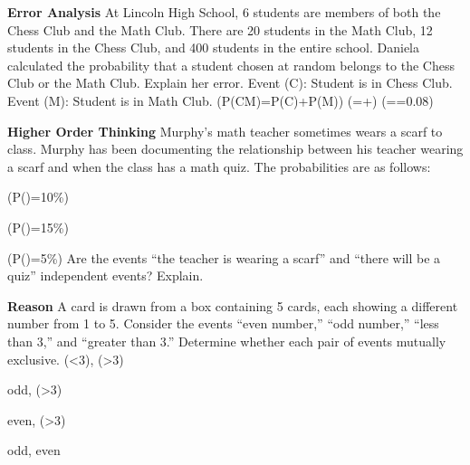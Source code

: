 \documentclass{article}
\newenvironment{practice}[2]{}{}        %
\newcommand{\answer}[1]{}               %
\newcommand{\te}[1]{}                   %
\begin{document}
\begin{practice}{10}{3}
\textbf{Error Analysis} At Lincoln High School, 6 students are members of both the Chess Club and the Math Club. There are 20 students in the Math Club, 12 students in the Chess Club, and 400 students in the entire school.
Daniela calculated the probability that a student chosen at random belongs to the Chess Club or the Math Club. Explain her error.
Event (C): Student is in Chess Club.
Event (M): Student is in Math Club.
(P(CM)=P(C)+P(M))
(=+)
(==0.08)
\te{Red X marks the student's work.}
\answer{The events (C) and (M) are not mutually exclusive, so it is not true that (P(C\text{ or }M)=P(C)+P(M)). So, subtract the probability that a student is in both clubs to find the probability that a random student is in the Chess Club or the Math Club. (P(C\text{ or }M)=P(C)+P(M)-P(C\text{ and }M)).}
\end{practice}
\begin{practice}{11}{2}
\textbf{Higher Order Thinking} Murphy's math teacher sometimes wears a scarf to class. Murphy has been documenting the relationship between his teacher wearing a scarf and when the class has a math quiz. The probabilities are as follows:
\item (P()=10\%)
\item (P()=15\%)
\item (P()=5\%)
Are the events “the teacher is wearing a scarf” and “there will be a quiz” independent events? Explain.
\answer{No; two events (A) and (B) are independent if and only if (P(A)\cdot P(B)=P(A\text{ and }B)) and ((0.10)(0.15)\neq0.05).}
\end{practice}
\begin{practice}{12}{1}
\textbf{Reason} A card is drawn from a box containing 5 cards, each showing a different number from 1 to 5. Consider the events “even number,” “odd number,” “less than 3,” and “greater than 3.” Determine whether each pair of events mutually exclusive.
(<3), (>3)
\answer{yes}
\te{Printed prompt omits are before mutually exclusive. Shared directions apply to Exercises 12--15.}
\end{practice}
\begin{practice}{13}{1}
odd, (>3)
\answer{no}
\end{practice}
\begin{practice}{14}{1}
even, (>3)
\answer{no}
\end{practice}
\begin{practice}{15}{1}
odd, even
\answer{yes}
\end{practice}
\end{document}
